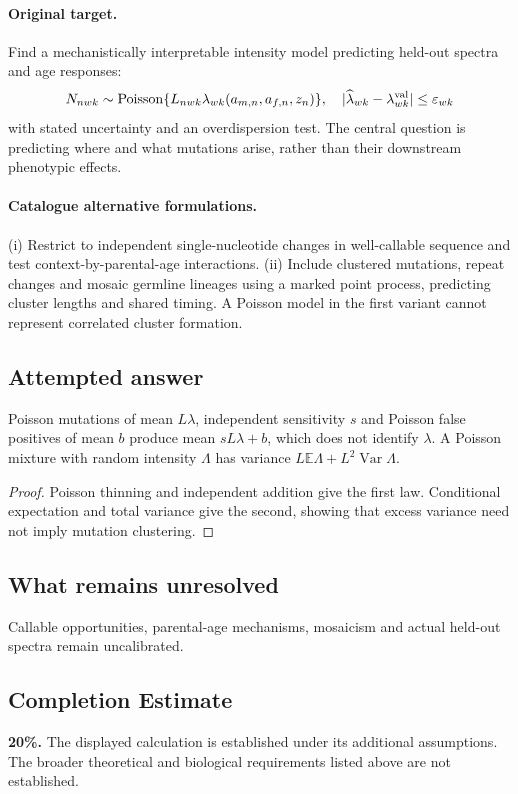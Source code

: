 \documentclass[11pt]{article}
\begin{document}
\paragraph{Original target.}
Find a mechanistically interpretable intensity model predicting held-out spectra and age responses:
\[
N_{nwk}\sim\operatorname{Poisson}\{L_{nwk}\lambda_{wk}(a_{m,n},a_{f,n},z_n)\},
\quad |\widehat\lambda_{wk}-\lambda^{\rm val}_{wk}|\leq\varepsilon_{wk}
\]
with stated uncertainty and an overdispersion test. The central question is predicting where and what mutations arise, rather than their downstream phenotypic effects.
\paragraph{Catalogue alternative formulations.}
(i) Restrict to independent single-nucleotide changes in well-callable sequence and test context-by-parental-age interactions. (ii) Include clustered mutations, repeat changes and mosaic germline lineages using a marked point process, predicting cluster lengths and shared timing. A Poisson model in the first variant cannot represent correlated cluster formation.
\subsection{Attempted answer}
\begin{proposition}
Poisson mutations of mean $L\lambda$, independent sensitivity $s$ and Poisson false positives of mean $b$ produce mean $sL\lambda+b$, which does not identify $\lambda$. A Poisson mixture with random intensity $\Lambda$ has variance $L\mathbb{E}\Lambda+L^2\operatorname{Var}\Lambda$.
\end{proposition}
\begin{proof}
Poisson thinning and independent addition give the first law. Conditional expectation and total variance give the second, showing that excess variance need not imply mutation clustering.
\end{proof}
\subsection{What remains unresolved}
Callable opportunities, parental-age mechanisms, mosaicism and actual held-out spectra remain uncalibrated.
\subsection{Completion Estimate}
\textbf{20\%.} The displayed calculation is established under its additional assumptions. The broader theoretical and biological requirements listed above are not established.
\end{document}
